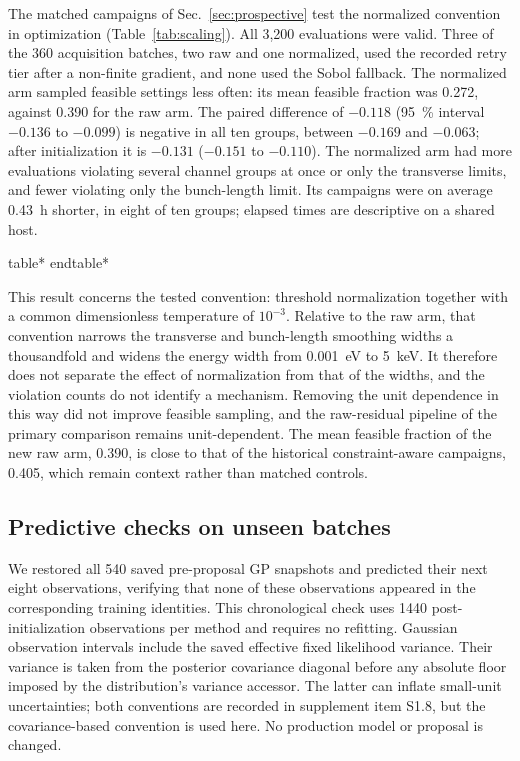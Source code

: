 \documentclass[aps,prab,reprint,superscriptaddress,amsmath,amssymb,floatfix]{revtex4-2}
\newcommand{\inputwide}[1]{\begingroup
  \expandafter\let\expandafter\table\csname table*\endcsname
  \expandafter\let\expandafter\endtable\csname endtable*\endcsname
  \endgroup}
\begin{document}
The matched campaigns of Sec.~\ref{sec:prospective} test the normalized convention in
optimization (Table~\ref{tab:scaling}). All 3,200 evaluations were valid. Three of the 360
acquisition batches, two raw and one normalized, used the recorded retry tier after a
non-finite gradient, and none used the Sobol fallback. The normalized arm sampled feasible
settings less often: its mean feasible fraction was 0.272, against 0.390 for the raw arm. The
paired difference of $-0.118$ (\SI{95}{\percent} interval $-0.136$ to $-0.099$) is negative in
all ten groups, between $-0.169$ and $-0.063$; after initialization it is $-0.131$ ($-0.151$ to
$-0.110$). The normalized arm had more evaluations violating several channel groups at once or
only the transverse limits, and fewer violating only the bunch-length limit. Its campaigns were
on average \SI{0.43}{\hour} shorter, in eight of ten groups; elapsed times are descriptive on a
shared host.

\inputwide{revisions/evidence/r6_scaling_table}

This result concerns the tested convention: threshold normalization together with a common
dimensionless temperature of $10^{-3}$. Relative to the raw arm, that convention narrows the
transverse and bunch-length smoothing widths a thousandfold and widens the energy width from
\SI{0.001}{\electronvolt} to \SI{5}{\kilo\electronvolt}. It therefore does not separate the effect
of normalization from that of the widths, and the violation counts do not identify a mechanism.
Removing the unit dependence in this way did not improve feasible sampling, and the raw-residual
pipeline of the primary comparison remains unit-dependent. The mean feasible fraction of the new
raw arm, 0.390, is close to that of the historical constraint-aware campaigns, 0.405, which remain
context rather than matched controls.

\subsection{Predictive checks on unseen batches}
\label{sec:predictive_checks}
We restored all 540 saved pre-proposal GP snapshots and predicted their next eight observations,
verifying that none of these observations appeared in the corresponding training identities.
This chronological check uses \num{1440} post-initialization observations per method and
requires no refitting. Gaussian observation intervals include the saved effective fixed
likelihood variance. Their variance is taken from the posterior covariance diagonal before
any absolute floor imposed by the distribution's variance accessor. The latter can inflate
small-unit uncertainties; both conventions are recorded in supplement item S1.8, but the
covariance-based convention is used here. No production model or proposal is changed.
\end{document}
